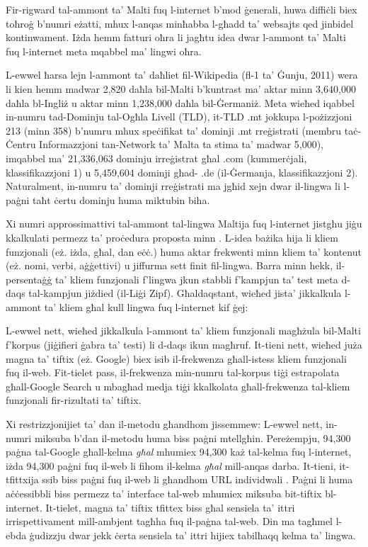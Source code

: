 \documentclass[]{../../metanetpaper}
\begin{document}
\begin{multicols}{2}
Fir-rigward tal-ammont ta’ Malti fuq l-internet b’mod ġenerali, huwa diffiċli biex toħroġ b’numri eżatti, mhux l-anqas minħabba l-għadd ta’ websajts qed jinbidel kontinwament. Iżda hemm fatturi oħra li jagħtu idea dwar l-ammont ta’ Malti fuq l-internet meta mqabbel ma’ lingwi oħra.
    
L-ewwel ħarsa lejn l-ammont ta’ daħliet fil-Wikipedia (fl-1 ta’ Ġunju, 2011) wera li kien hemm madwar 2,820 daħla bil-Malti b’kuntrast ma’ aktar minn 3,640,000 daħla bl-Ingliż u aktar minn 1,238,000 daħla bil-Ġermaniż.
Meta wieħed iqabbel in-numru tad-Dominju tal-Ogħla Livell (TLD), it-TLD .mt jokkupa l-pożizzjoni 213 (minn 358) b’numru mhux speċifikat ta’ dominji .mt rreġistrati (membru taċ-Ċentru Informazzjoni tan-Network ta' Malta ta stima ta’ madwar 5,000), imqabbel ma’ 21,336,063 dominju irreġistrat għal .com (kummerċjali, klassifikazzjoni 1) u 5,459,604 dominji għad- .de (il-Ġermanja, klassifikazzjoni 2). Naturalment, in-numru ta’ dominji rreġistrati ma jgħid xejn dwar il-lingwa li l-paġni taħt ċertu dominju huma miktubin biha. 
    
Xi numri approssimattivi tal-ammont tal-lingwa Maltija fuq l-internet jistgħu jiġu kkalkulati permezz ta’ proċedura proposta minn \cite{Kilgarriff-Grefenstette:2003,Gatt1mt}. L-idea bażika hija li kliem funzjonali (eż. iżda, għal, dan eċċ.) huma aktar frekwenti minn kliem ta’ kontenut (eż. nomi, verbi, aġġettivi) u jiffurma sett finit fil-lingwa. Barra minn hekk, il-persentaġġ ta’ kliem funzjonali f'lingwa jkun stabbli f'kampjun ta’ test meta d-daqs tal-kampjun jiżdied (il-Liġi Zipf). Għaldaqstant, wieħed jista’ jikkalkula l-ammont ta’ kliem għal kull lingwa fuq l-internet kif ġej:
    
L-ewwel nett, wieħed jikkalkula l-ammont ta’ kliem funzjonali magħżula bil-Malti f’korpus (jiġifieri ġabra ta’ testi) li d-daqs ikun magħruf. It-tieni nett, wieħed juża magna ta’ tiftix (eż. Google) biex isib il-frekwenza għall-istess kliem funzjonali fuq il-web. Fit-tielet pass, il-frekwenza min-numru tal-korpus tiġi estrapolata għall-Google Search u mbagħad medja tiġi kkalkolata għall-frekwenza tal-kliem funzjonali fir-rizultati ta’ tiftix.
    
Xi restrizzjonijiet ta’ dan il-metodu għandhom jissemmew: L-ewwel nett, in-numri miksuba b’dan il-metodu huma biss paġni mtellgħin. Pereżempju, 94,300 paġna tal-Google għall-kelma \emph{għal} mhumiex 94,300 każ tal-kelma fuq l-internet, iżda 94,300 paġni fuq il-web li fihom il-kelma \emph{għal} mill-anqas darba. It-tieni, it-tfittxija ssib biss paġni fuq il-web li għandhom URL individwali \cite{Kilgarriff-Grefenstette:2003}. Paġni li huma aċċessibbli biss permezz ta’ interface tal-web mhumiex miksuba bit-tiftix bl-internet. It-tielet, magna ta’ tiftix tfittex biss għal sensiela ta’ ittri irrispettivament mill-ambjent tagħha fuq il-paġna tal-web. Din ma tagħmel l-ebda ġudizzju dwar jekk ċerta sensiela ta’ ittri hijiex tabilħaqq kelma ta’ lingwa.
    

\end{multicols}
\end{document}
